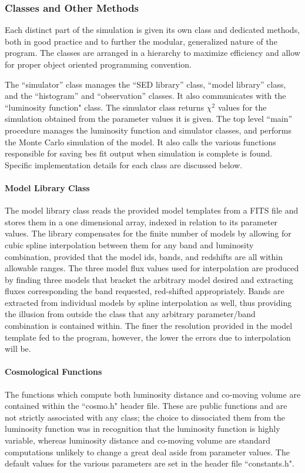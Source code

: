 \documentclass[twocolumn,letterpaper,10pt]{article}
\begin{document}
\subsubsection{Classes and Other Methods}
Each distinct part of the simulation is given its own class and dedicated methods, both in good practice and to further the modular, generalized nature of the program. The classes are arranged in a hierarchy to maximize efficiency and allow for proper object oriented programming convention. 

The ``simulator'' class manages the ``SED library'' class, ``model library'' class, and the ``histogram'' and ``observation'' classes. It also communicates with the ``luminosity function" class. The simulator class returns $\chi^2$ values for the simulation obtained from the parameter values it is given. The top level ``main'' procedure manages the luminosity function and simulator classes, and performs the Monte Carlo simulation of the model. It also calls the various functions responsible for saving bes fit output when simulation is complete is found. Specific implementation details for each class are discussed below.

\paragraph{Model Library Class}\label{class:models}
The model library class reads the provided model templates from a FITS file and stores them in a one dimensional array, indexed in relation to its parameter values. The library compensates for the finite number of models by allowing for cubic spline interpolation between them for any band and luminosity combination, provided that the model ids, bands, and redshifts are all within allowable ranges. The three model flux values used for interpolation are produced by finding three models that bracket the arbitrary model desired and extracting fluxes corresponding the band requested, red-shifted appropriately. Bands are extracted from individual models by spline interpolation as well, thus providing the illusion from outside the class that any arbitrary parameter/band combination is contained within. The finer the resolution provided in the model template fed to the program, however, the lower the errors due to interpolation will be. 

\paragraph{Cosmological Functions}
The functions which compute both luminosity distance and co-moving volume are contained within the ``cosmo.h" header file. These are public functions and are not strictly associated with any class; the choice to dissociated them from the luminosity function was in recognition that the luminosity function is highly variable, whereas luminosity distance and co-moving volume are standard computations unlikely to change a great deal aside from parameter values. The default values for the various parameters are set in the header file ``constants.h".
\end{document}

